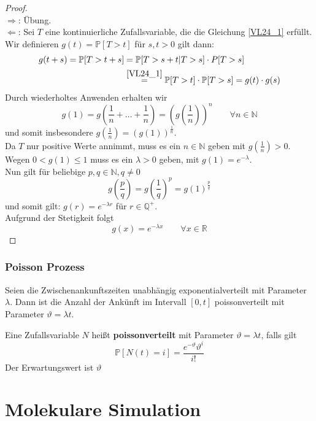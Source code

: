 \documentclass[]{article}
\begin{document}
\begin{proof}~\\
$\Rightarrow$: Übung. \\
$\Leftarrow$: 
Sei $T$ eine kontinuierliche Zufallsvariable, die die Gleichung \eqref{VL24_1} erfüllt. Wir definieren $g(t) = \mathbb{P}[T > t]$ für $s,t > 0$ gilt dann:
\begin{align*}
g(t+s) = \mathbb{P}[T > t+s] &= \mathbb{P}[T > s+t | T>s] \cdot P[T > s] \\
&\stackrel{\eqref{VL24_1}}{=} \mathbb{P}[T > t] \cdot \mathbb{P}[T > s] = g(t) \cdot g(s)
\end{align*} 
Durch wiederholtes Anwenden erhalten wir
\begin{equation*}
g(1) = g\left(\frac{1}{n} + \dots + \frac{1}{n}\right) = \left( g\left( \frac{1}{n} \right) \right)^n \qquad \forall n \in \mathbb{N}
\end{equation*}
und somit insbesondere $g \left( \frac{1}{n} \right) = (g(1))^{\frac{1}{n}}$. \\
Da $T$ nur positive Werte annimmt, muss es ein $n \in \mathbb{N}$ geben mit $g\left( \frac{1}{n} \right) > 0$. Wegen $0 < g(1) \leq 1$ muss es ein $\lambda > 0$ geben, mit $g(1) = e^{-\lambda}$. \\
Nun gilt für beliebige $p, q \in \mathbb{N}, q \neq 0$
\[ g \left( \frac{p}{q} \right) = g\left( \frac{1}{q} \right)^p = g(1)^{\frac{p}{q}} \]
und somit gilt: $g(r) = e^{- \lambda r}$ für $r \in \mathbb{Q}^+$. \\
Aufgrund der Stetigkeit folgt 
\[g(x) = e^{-\lambda x} \qquad \forall x \in \mathbb{R} \]
\end{proof}

\subsubsection*{Poisson Prozess}
Seien die Zwischenankunftszeiten unabhängig exponentialverteilt mit Parameter $\lambda$. Dann ist die Anzahl der Ankünft im Intervall $[0,t] $ poissonverteilt mit Parameter $\vartheta = \lambda t$.

Eine Zufallsvariable $N$ heißt \textbf{poissonverteilt} mit Parameter $\vartheta = \lambda t$, falls gilt
\[ \mathbb{P}[ N(t) = i ] = \frac{e^{-\vartheta} \vartheta^i}{i !} \]
Der Erwartungswert ist $\vartheta$

\section{Molekulare Simulation}
\end{document}
